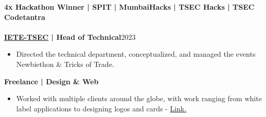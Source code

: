 \documentclass[a4paper,11pt]{article}
\newcommand{\entry}[2]{
  \noindent\textbf{#1}\hfill{#2}\\[-1em]
}
\newenvironment{itemizeWithPadding}{
  \begin{itemize}
}{
  \end{itemize}
  \vspace{0.5em} %
}
\begin{document}
\entry{4x Hackathon Winner | SPIT | MumbaiHacks | TSEC Hacks | TSEC Codetantra}{}\\
\entry{\href{https://ietetsec.in/}{IETE-TSEC} | Head of Technical}{2023}
\begin{itemizeWithPadding}
    \item Directed the technical department, conceptualized, and managed the events Newbiethon \& Tricks of Trade.
\end{itemizeWithPadding}

\entry{Freelance | Design \& Web}{}
\begin{itemizeWithPadding}
  \item Worked with multiple clients around the globe, with work ranging from white label applications to designing logos and cards - \href{https://rms-frontend-inky.vercel.app/}{Link.}
\end{itemizeWithPadding}
\end{document}

